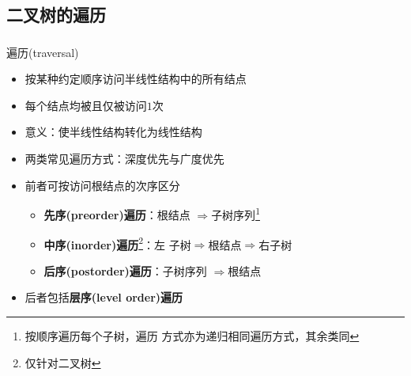 \subsection{二叉树的遍历}

\begin{frame}
    \frametitle{\insertsubsectionhead}
    \begin{block}{遍历(traversal)}
        \begin{itemize}
            \item 按某种约定顺序访问半线性结构中的所有结点
            \item 每个结点均\alert{被且仅被}访问$1$次
            \item \alert{意义}：使半线性结构转化为线性结构
            \item 两类常见遍历方式：\alert{深度}优先与\alert{广度}优先
            \item 前者可按访问\alert{根}结点的次序区分
                \begin{itemize}
                    \item \textbf{先序(preorder)遍历}：\alert{根}结点
                        $\Rightarrow$子树序列\footnote{按顺序遍历每个子树，遍历
                        方式亦为递归相同遍历方式，其余类同}
                    \item \textbf{中序(inorder)遍历}\footnote{仅针对二叉树}：左
                        子树$\Rightarrow$\alert{根}结点$\Rightarrow$右子树
                    \item \textbf{后序(postorder)遍历}：子树序列
                        $\Rightarrow$\alert{根}结点
                \end{itemize}
            \item 后者包括\textbf{层序(level order)遍历}
        \end{itemize}
    \end{block}
\end{frame}

